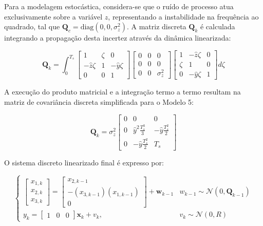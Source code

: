 \documentclass[a4paper,12pt]{article}
\begin{document}
Para a modelagem estocástica, considera-se que o ruído de processo atua exclusivamente sobre a variável $z$, representando a instabilidade na frequência ao quadrado, tal que $\mathbf{Q}_c = \text{diag}(0, 0, \sigma_{z}^2)$. A matriz discreta $\mathbf{Q}_k$ é calculada integrando a propagação desta incertez através da dinâmica linearizada:

\begin{equation}
    \mathbf{Q}_k = \int_{0}^{T_s} \begin{bmatrix} 1 & \zeta & 0 \\ -\hat{z} \zeta & 1 & -\hat{y} \zeta \\ 0 & 0 & 1 \end{bmatrix} \begin{bmatrix} 0 & 0 & 0 \\ 0 & 0 & 0 \\ 0 & 0 & \sigma_{z}^2 \end{bmatrix} \begin{bmatrix} 1 & -\hat{z} \zeta & 0 \\ \zeta & 1 & 0 \\ 0 & -\hat{y} \zeta & 1 \end{bmatrix} d\zeta
\end{equation}

A execução do produto matricial e a integração termo a termo resultam na matriz de covariância discreta simplificada para o Modelo 5:

\begin{equation}
    \mathbf{Q}_k = \sigma_{z}^2 \begin{bmatrix} 
        0 & 0 & 0 \\ 
        0 & \hat{y}^2 \frac{T_s^3}{3} & -\hat{y} \frac{T_s^2}{2} \\ 
        0 & -\hat{y} \frac{T_s^2}{2} & T_s 
    \end{bmatrix}
    \label{eq:mod5_Qk_final}
\end{equation}


O sistema discreto linearizado final é expresso por:

\begin{equation}
    \begin{cases}
        \begin{bmatrix} x_{1,k} \\ x_{2,k} \\ x_{3,k} \end{bmatrix} = \begin{bmatrix} x_{2,k-1} \\ -(x_{3,k-1}) (x_{1,k-1})\\ 0 \end{bmatrix} + \mathbf{w}_{k-1} & w_{k-1} \sim \mathcal{N}(0, \mathbf{Q}_{k-1}) \\ 
        y_k = \begin{bmatrix} 1 & 0 & 0 \end{bmatrix} \mathbf{x}_{k} + v_k, & v_k \sim \mathcal{N}(0, R)
    \end{cases}
    \label{eq:mod5_sistema_discreto_completo}
\end{equation}
\end{document}
